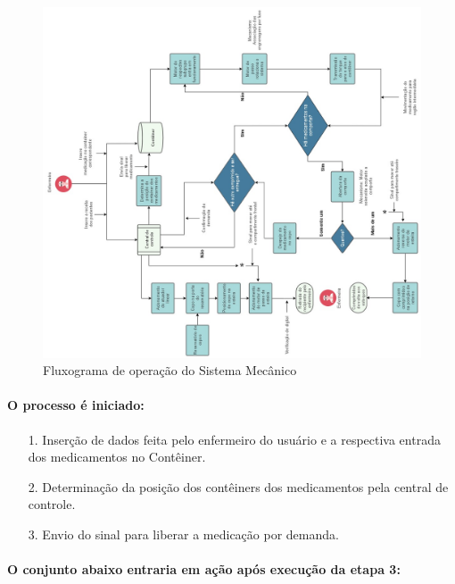 \begin{figure}[ht]
        \centering
        \includegraphics[width=1.15\textwidth, angle = -90]{figuras/estrutura/FEstrV35.jpg}
        \caption{Fluxograma de operação do Sistema Mecânico}
        \label{fig:FEst}
    \end{figure}

\paragraph*{O processo é iniciado:}

\begin{enumerate}
    \item[1.] Inserção de dados feita pelo enfermeiro do usuário e a respectiva entrada dos medicamentos no Contêiner.
    \item[2.] Determinação da posição dos contêiners dos medicamentos pela central de controle.
    \item[3.] Envio do sinal para liberar a medicação por demanda.
    \end{enumerate} 
   
\paragraph*{O conjunto abaixo entraria em ação após execução da etapa 3:}

